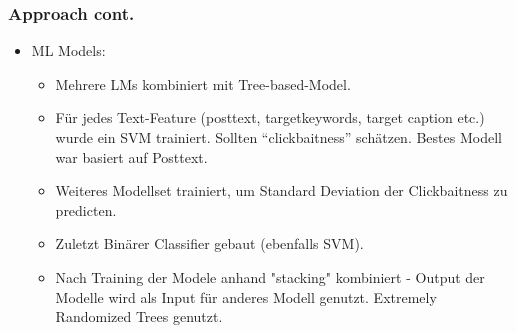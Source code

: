 \documentclass{beamer}
\begin{document}
\begin{frame}
	\frametitle{Approach cont.}
        \begin{itemize}
		\item ML Models:
		    \begin{itemize}
		    \item Mehrere LMs kombiniert mit Tree-based-Model.
			\item Für jedes Text-Feature (posttext, targetkeywords, target caption etc.) wurde ein SVM trainiert. Sollten \enquote{clickbaitness} schätzen. Bestes Modell war basiert auf Posttext.
		    \item Weiteres Modellset trainiert, um Standard Deviation der Clickbaitness zu predicten. 
			\item Zuletzt Binärer Classifier gebaut (ebenfalls SVM).
			\item Nach Training der Modele anhand "stacking" kombiniert - Output der Modelle wird als Input für anderes Modell genutzt. Extremely Randomized Trees genutzt.
			\end{itemize}
        \end{itemize}
\end{frame}
\end{document}
